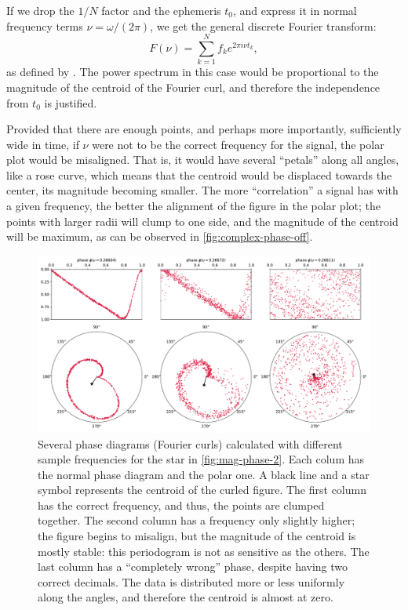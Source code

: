 	If we drop the $1/N$ factor and the ephemeris $t_0$, and express it in normal frequency terms $\nu=\omega/(2\pi)$, we get the general discrete Fourier transform:
	\begin{equation}
		F(\nu) = \sum_{k=1}^N f_k e^{2\pi i \nu t_k}, \label{eq:fourier}
	\end{equation} 
	as defined by \cite{Deeming1975,Thomson1971,Schuster1898}. 
	The power spectrum in this case would be proportional to the magnitude of the centroid of the Fourier curl, 
	and therefore the independence from $t_0$ is justified.
	
	Provided that there are enough points, and perhaps more importantly, sufficiently wide in time, 
	if $\nu$ were not to be the correct frequency for the signal, the polar plot would be misaligned.
	That is, it would have several \enquote{petals} along all angles, like a rose curve,
	which means that the centroid would be displaced towards the center, its magnitude becoming smaller.
	The more \enquote{correlation} a signal has with a given frequency, the better the alignment of the figure in the polar plot;
	the points with larger radii will clump to one side, and the magnitude of the centroid will be maximum, as can be observed in \autoref{fig:complex-phase-off}.
	
	\begin{figure}
		\centering
		\includegraphics[width=\textwidth]{img/complex_phase_off.pdf}
		\caption[Off-frequency phase diagrams: real and complex]{
			Several phase diagrams (Fourier curls) calculated with different sample frequencies for the star in \autoref{fig:mag-phase-2}.
			Each colum has the normal phase diagram and the polar one. A black line and a star symbol represents the centroid of the curled figure.
			The first column has the correct frequency, and thus, the points are clumped together.
			The second column has a frequency only slightly higher; the figure begins to misalign, 
			but the magnitude of the centroid is mostly stable: this periodogram is not as sensitive as the others.
			The last column has a \enquote{completely wrong} phase, despite having two correct decimals.
			The data is distributed more or less uniformly along the angles, and therefore the centroid is almost at zero.
		}
		\label{fig:complex-phase-off}
	\end{figure}
	
